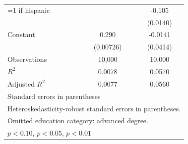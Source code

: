 \begin{table}[H]
\begin{tabular}{l*{2}{c}}
=1 if hispanic      &                     &      -0.105\sym{***}\\
                    &                     &    (0.0140)         \\
\addlinespace
Constant            &       0.290\sym{***}&     -0.0141         \\
                    &   (0.00726)         &    (0.0414)         \\
\midrule
Observations        &      10,000         &      10,000         \\
$R^2$               &      0.0078         &      0.0570         \\
Adjusted $R^2$      &      0.0077         &      0.0560         \\
\bottomrule
\multicolumn{3}{l}{\footnotesize Standard errors in parentheses}\\
\multicolumn{3}{l}{\footnotesize Heteroskedasticity-robust standard errors in parentheses.}\\
\multicolumn{3}{l}{\footnotesize Omitted education category: advanced degree.}\\
\multicolumn{3}{l}{\footnotesize \sym{*} \(p<0.10\), \sym{**} \(p<0.05\), \sym{***} \(p<0.01\)}\\
\end{tabular}
\end{table}

